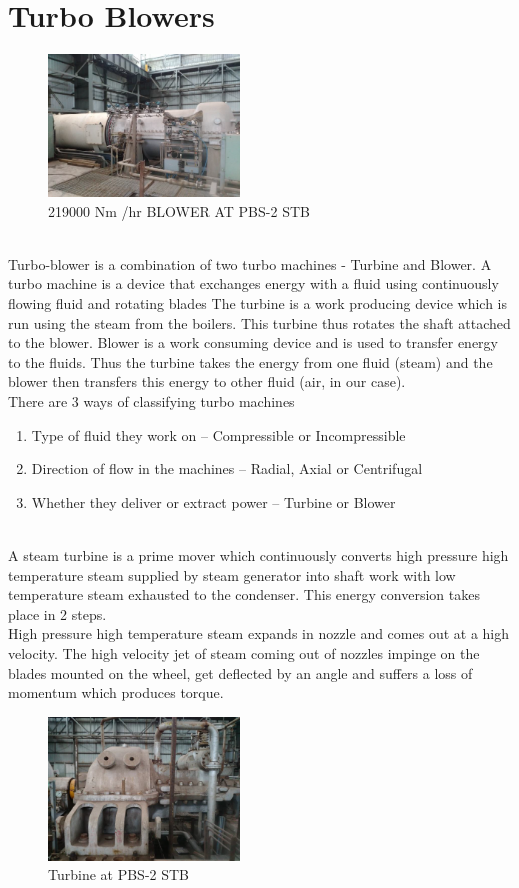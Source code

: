 \documentclass[english,11pt]{report}
\begin{document}
\section{Turbo Blowers}
\begin{figure}[h!]
 \begin{center}
  \caption{219000 Nm /hr BLOWER AT PBS-2 STB}
  \includegraphics[width=2in]{blowerstb.png}
 \end{center}
\end{figure}\\
Turbo-blower is a combination of two turbo machines - Turbine and Blower. A turbo machine is a device that exchanges energy with a fluid using continuously flowing fluid and rotating blades The turbine is a work producing device which is run using the steam from the boilers. This turbine thus rotates the shaft attached to the blower. Blower is a work consuming device and is used to transfer energy to the fluids. Thus the turbine takes the energy from one fluid (steam) and the blower then transfers this energy to other fluid (air, in our case).\\
There are 3 ways of classifying turbo machines 
\begin{enumerate}
  \item Type of fluid they work on – Compressible or Incompressible
  \item Direction of flow in the machines – Radial, Axial or Centrifugal 
  \item Whether they deliver or extract power – Turbine or Blower 
\end{enumerate}\\


A steam turbine is a prime mover which continuously converts high pressure high temperature steam supplied by steam generator into shaft work with low temperature steam exhausted to the condenser. This energy conversion takes place in 2 steps.\\ 
High pressure high temperature steam expands in nozzle and comes out at a high velocity. The high velocity jet of steam coming out of nozzles impinge on the blades mounted on the wheel, get deflected by an angle and suffers a loss of momentum which produces torque. 
\begin{figure}[h!]
 \begin{center}
  \caption{Turbine at PBS-2 STB}
  \includegraphics[width=2in]{turbinestb.png}
 \end{center}
\end{figure}
\end{document}
